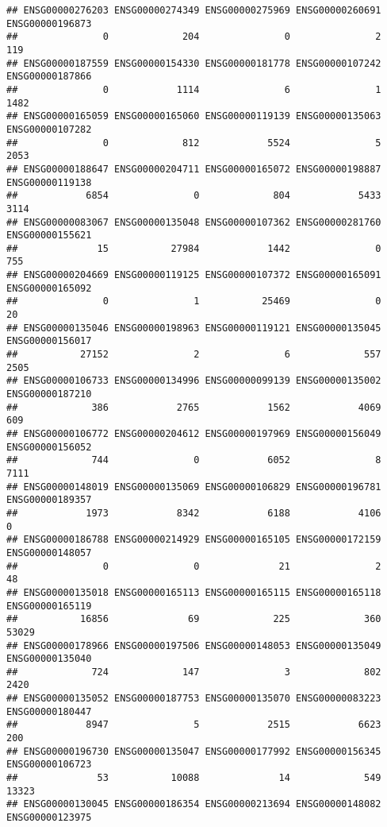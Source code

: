 \documentclass[
]{article}
\begin{document}
\begin{verbatim}
## ENSG00000276203 ENSG00000274349 ENSG00000275969 ENSG00000260691 ENSG00000196873 
##               0             204               0               2             119 
## ENSG00000187559 ENSG00000154330 ENSG00000181778 ENSG00000107242 ENSG00000187866 
##               0            1114               6               1            1482 
## ENSG00000165059 ENSG00000165060 ENSG00000119139 ENSG00000135063 ENSG00000107282 
##               0             812            5524               5            2053 
## ENSG00000188647 ENSG00000204711 ENSG00000165072 ENSG00000198887 ENSG00000119138 
##            6854               0             804            5433            3114 
## ENSG00000083067 ENSG00000135048 ENSG00000107362 ENSG00000281760 ENSG00000155621 
##              15           27984            1442               0             755 
## ENSG00000204669 ENSG00000119125 ENSG00000107372 ENSG00000165091 ENSG00000165092 
##               0               1           25469               0              20 
## ENSG00000135046 ENSG00000198963 ENSG00000119121 ENSG00000135045 ENSG00000156017 
##           27152               2               6             557            2505 
## ENSG00000106733 ENSG00000134996 ENSG00000099139 ENSG00000135002 ENSG00000187210 
##             386            2765            1562            4069             609 
## ENSG00000106772 ENSG00000204612 ENSG00000197969 ENSG00000156049 ENSG00000156052 
##             744               0            6052               8            7111 
## ENSG00000148019 ENSG00000135069 ENSG00000106829 ENSG00000196781 ENSG00000189357 
##            1973            8342            6188            4106               0 
## ENSG00000186788 ENSG00000214929 ENSG00000165105 ENSG00000172159 ENSG00000148057 
##               0               0              21               2              48 
## ENSG00000135018 ENSG00000165113 ENSG00000165115 ENSG00000165118 ENSG00000165119 
##           16856              69             225             360           53029 
## ENSG00000178966 ENSG00000197506 ENSG00000148053 ENSG00000135049 ENSG00000135040 
##             724             147               3             802            2420 
## ENSG00000135052 ENSG00000187753 ENSG00000135070 ENSG00000083223 ENSG00000180447 
##            8947               5            2515            6623             200 
## ENSG00000196730 ENSG00000135047 ENSG00000177992 ENSG00000156345 ENSG00000106723 
##              53           10088              14             549           13323 
## ENSG00000130045 ENSG00000186354 ENSG00000213694 ENSG00000148082 ENSG00000123975 

\end{verbatim}
\end{document}
